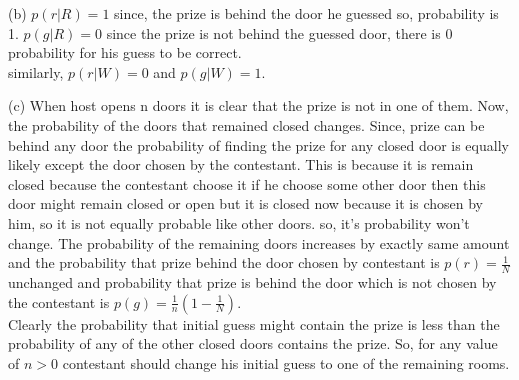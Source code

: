 \documentclass[11pt, a4paper]{article}
\begin{document}
(b) $p(r|R) =1$ since, the prize is behind the door he guessed so, probability is 1. $p(g|R)=0$ since the prize is not behind the guessed door, there is 0 probability for his guess to be correct.\\
similarly, $p(r|W) = 0$ and $p(g|W) = 1$.

(c) When host opens n doors it is clear that the prize is not in one of them. Now, the probability of the doors that remained closed changes. Since, prize can be behind any door the probability of finding the prize for any closed door is equally likely except the door chosen by the contestant. This is because it is remain closed because the contestant choose it  if he choose some other door then this door might remain closed or open but it is closed now because it is chosen by him, so it is not equally probable like other doors. so, it's probability won't change. 
The probability of the remaining doors increases by exactly same amount and the probability that prize behind the door chosen by contestant is $p(r) = \frac{1}{N}$ unchanged and probability that prize is behind the door which is not chosen by the contestant is $p(g) = \frac{1}{n}(1-\frac{1}{N})$. \\
Clearly the probability that initial guess might contain the prize is less than the probability of any of the other closed doors contains the prize. So, for any value of $n > 0$ contestant should change his initial guess to one of the remaining rooms.
    
\end{document}

